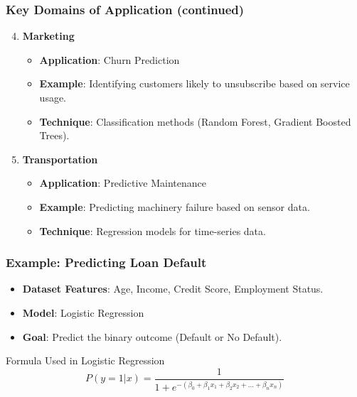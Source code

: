 \documentclass[aspectratio=169]{beamer}
\begin{document}
\begin{frame}[fragile]
    \frametitle{Key Domains of Application (continued)}
    \begin{enumerate}
        \setcounter{enumi}{3} %
        \item \textbf{Marketing}
            \begin{itemize}
                \item \textbf{Application}: Churn Prediction
                \item \textbf{Example}: Identifying customers likely to unsubscribe based on service usage.
                \item \textbf{Technique}: Classification methods (Random Forest, Gradient Boosted Trees).
            \end{itemize}

        \item \textbf{Transportation}
            \begin{itemize}
                \item \textbf{Application}: Predictive Maintenance
                \item \textbf{Example}: Predicting machinery failure based on sensor data.
                \item \textbf{Technique}: Regression models for time-series data.
            \end{itemize}
    \end{enumerate}
\end{frame}

\begin{frame}[fragile]
    \frametitle{Example: Predicting Loan Default}
    \begin{itemize}
        \item \textbf{Dataset Features}: Age, Income, Credit Score, Employment Status.
        \item \textbf{Model}: Logistic Regression
        \item \textbf{Goal}: Predict the binary outcome (Default or No Default).
    \end{itemize}
    \begin{block}{Formula Used in Logistic Regression}
        \begin{equation}
            P(y=1|x) = \frac{1}{1 + e^{-(\beta_0 + \beta_1 x_1 + \beta_2 x_2 + \ldots + \beta_n x_n)}}
        \end{equation}
    \end{block}
\end{frame}
\end{document}
